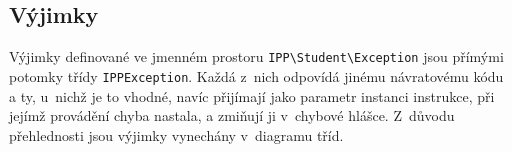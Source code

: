 \documentclass{article}[a4paper]
\begin{document}
    \subsection{Výjimky}

    Výjimky definované ve jmenném prostoru \texttt{IPP\textbackslash Student\textbackslash Exception} jsou přímými potomky třídy \texttt{IPPException}.
    Každá z~nich odpovídá jinému návratovému kódu a ty, u~nichž je to vhodné, navíc přijímají jako parametr instanci instrukce, při jejímž provádění chyba nastala, a zmiňují ji v~chybové hlášce.
    Z~důvodu přehlednosti jsou výjimky vynechány v~diagramu tříd.
\end{document}
